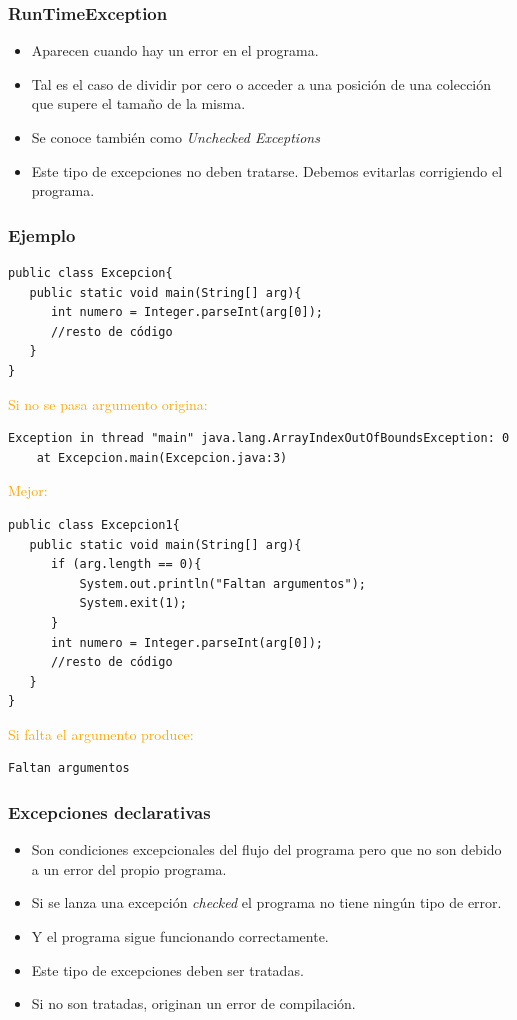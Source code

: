 \documentclass{beamer}
\begin{document}
\begin{frame}[fragile]
\frametitle{RunTimeException}
\begin{itemize}[<+->]
\item Aparecen cuando hay un error en el programa.
\item Tal es el caso de dividir por cero o acceder a una posición de una colección que supere el tamaño de la misma.
\item Se conoce también como \emph{Unchecked Exceptions}
\item Este tipo de excepciones no deben tratarse. Debemos evitarlas corrigiendo el programa.
\end{itemize}
\end{frame}

\begin{frame}[fragile]
\frametitle{Ejemplo}
\begin{scriptsize}
\begin{verbatim}
public class Excepcion{
   public static void main(String[] arg){
      int numero = Integer.parseInt(arg[0]);
      //resto de código
   }
}
\end{verbatim}
\pause
\textcolor{orange}{Si no se pasa argumento origina:}
\begin{verbatim}
Exception in thread "main" java.lang.ArrayIndexOutOfBoundsException: 0
	at Excepcion.main(Excepcion.java:3)
\end{verbatim}
\pause
\textcolor{orange}{Mejor:}
\begin{verbatim}
public class Excepcion1{
   public static void main(String[] arg){
      if (arg.length == 0){
          System.out.println("Faltan argumentos");
          System.exit(1);
      }
      int numero = Integer.parseInt(arg[0]);
      //resto de código
   }
}
\end{verbatim}
\pause
\textcolor{orange}{Si falta el argumento produce:}
\begin{verbatim}
Faltan argumentos
\end{verbatim}
\end{scriptsize}
\end{frame}

\begin{frame}[fragile]
\frametitle{Excepciones declarativas}
\begin{itemize}[<+->]
\item Son condiciones excepcionales del flujo del programa pero que no son debido a un error del propio programa. 
\item Si se lanza una excepción \emph{checked} el programa no tiene ningún tipo de error.
\item Y el programa sigue funcionando correctamente.
\item Este tipo de excepciones deben ser tratadas.
\item Si no son tratadas, originan un error de compilación.
\end{itemize}
\end{frame}
\end{document}
